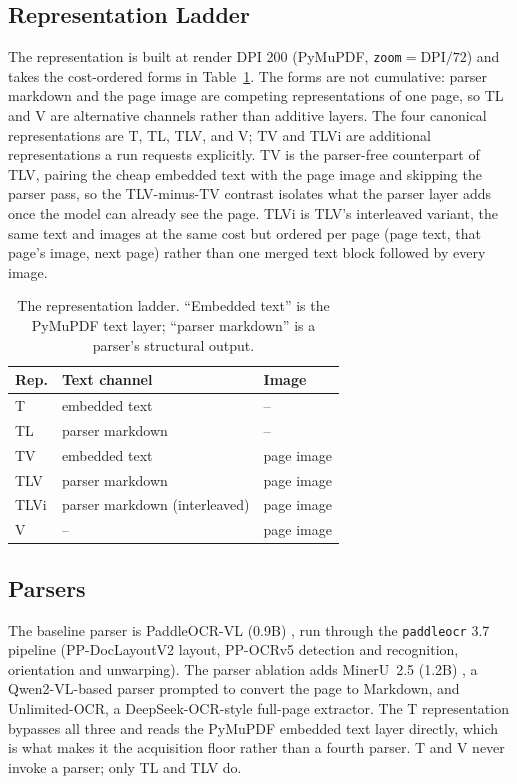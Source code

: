 \subsection{Representation Ladder}
\label{app:cfg_ladder}
The representation is built at render DPI 200 (PyMuPDF, \texttt{zoom}${}={}$DPI$/72$) and takes the cost-ordered forms in Table~\ref{tab:app_rungs}. The forms are not cumulative: parser markdown and the page image are competing representations of one page, so TL and V are alternative channels rather than additive layers. The four canonical representations are T, TL, TLV, and V; TV and TLVi are additional representations a run requests explicitly. TV is the parser-free counterpart of TLV, pairing the cheap embedded text with the page image and skipping the parser pass, so the TLV-minus-TV contrast isolates what the parser layer adds once the model can already see the page. TLVi is TLV's interleaved variant, the same text and images at the same cost but ordered per page (page text, that page's image, next page) rather than one merged text block followed by every image.

\begin{table}[t]
\centering\small
\begin{tabular}{lll}
\toprule
Rep. & Text channel & Image \\
\midrule
T    & embedded text          & -- \\
TL   & parser markdown        & -- \\
TV   & embedded text          & page image \\
TLV  & parser markdown        & page image \\
TLVi & parser markdown (interleaved) & page image \\
V    & --                     & page image \\
\bottomrule
\end{tabular}
\caption{The representation ladder. ``Embedded text'' is the PyMuPDF text layer; ``parser markdown'' is a parser's structural output.}
\label{tab:app_rungs}
\end{table}

\subsection{Parsers}
\label{app:cfg_parsers}
The baseline parser is PaddleOCR-VL (0.9B) \cite{cui2025paddleocrvl}, run through the \texttt{paddleocr} 3.7 pipeline (PP-DocLayoutV2 layout, PP-OCRv5 detection and recognition, orientation and unwarping). The parser ablation adds MinerU~2.5 (1.2B) \cite{niu2025mineru25}, a Qwen2-VL-based parser prompted to convert the page to Markdown, and Unlimited-OCR, a DeepSeek-OCR-style full-page extractor. The T representation bypasses all three and reads the PyMuPDF embedded text layer directly, which is what makes it the acquisition floor rather than a fourth parser. T and V never invoke a parser; only TL and TLV do.

